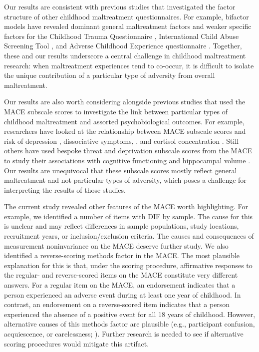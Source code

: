 \documentclass[letterpaper,man,natbib,longtable,floatsintext,12pt]{apa6}
\begin{document}
Our results are consistent with previous studies that investigated the factor structure of other childhood maltreatment questionnaires. For example, bifactor models have revealed dominant general maltreatment factors and weaker specific factors for the Childhood Trauma Questionnaire \citep{spinhoven2014childhood, stagaki2022mediating}, International Child Abuse Screening Tool \citep{meinck2021factor}, and Adverse Childhood Experience questionnaire \citep{dobson2021latent}. Together, these and our results underscore a central challenge in childhood maltreatment research: when maltreatment experiences tend to co-occur, it is difficult to isolate the unique contribution of a particular type of adversity from overall maltreatment.
 
Our results are also worth considering alongside previous studies that used the MACE subscale scores to investigate the link between particular types of childhood maltreatment and assorted psychobiological outcomes. For example, researchers have looked at the relationship between MACE subscale scores and risk of depression \citep{gerke2018childhood}, dissociative symptoms, \citep{schalinski2015type}, and cortisol concentration \citep{schalinski2019early}. Still others have used bespoke threat and deprivation subscale scores from the MACE to study their associations with cognitive functioning \citep{schalinski2018defining} and hippocampal volume \citep{teicher2018differential}. Our results are unequivocal that these subscale scores mostly reflect general maltreatment and not particular types of adversity, which poses a challenge for interpreting the results of those studies. 

The current study revealed other features of the MACE worth highlighting. For example, we identified a number of items with DIF by sample. The cause for this is unclear and may reflect differences in sample populations, study locations, recruitment years, or inclusion/exclusion criteria. The causes and consequences of measurement noninvariance on the MACE deserve further study. We also identified a reverse-scoring methods factor in the MACE. The most plausible explanation for this is that, under the \cite{teicher2015maltreatment} scoring procedure, affirmative responses to the regular- and reverse-scored items on the MACE constitute very different answers. For a regular item on the MACE, an endorsement indicates that a person experienced an adverse event during at least one year of childhood. In contrast, an endorsement on a reverse-scored item indicates that a person experienced the absence of a positive event for all 18 years of childhood. However, alternative causes of this methods factor are plausible (e.g., participant confusion, acquiescence, or carelessness; \citealt{weijters2013reversed}). Further research is needed to see if alternative scoring procedures would mitigate this artifact. 
\end{document}
